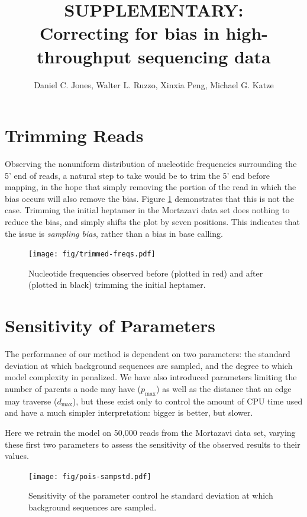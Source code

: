 \documentclass[letterpaper]{article}
\title{SUPPLEMENTARY:\\Correcting for bias in high-throughput sequencing data}
\author{Daniel C. Jones, Walter L. Ruzzo, Xinxia Peng, Michael G. Katze}
\begin{document}


\section{Trimming Reads}

Observing the nonuniform distribution of nucleotide frequencies surrounding the
5' end of reads, a natural step to take would be to trim the 5' end before
mapping, in the hope that simply removing the portion of the read in which the
bias occurs will also remove the bias. Figure \ref{fig:trimmedfreqs}
demonstrates that this is not the case. Trimming the initial heptamer in the
Mortazavi data set does nothing to reduce the bias, and simply shifts the plot
by seven positions. This indicates that the issue is \emph{sampling bias},
rather than a bias in base calling.

\begin{figure}[H]
\begin{center}
\texttt{[image: fig/trimmed-freqs.pdf]}
\end{center}
\caption{Nucleotide frequencies observed before (plotted in red) and after
(plotted in black) trimming the initial heptamer.}
\label{fig:trimmedfreqs}
\end{figure}


\section{Sensitivity of Parameters}

The performance of our method is dependent on two parameters: the standard
deviation at which background sequences are sampled, and the degree to which
model complexity in penalized. We have also introduced parameters limiting the
number of parents a node may have ($p_{\text{max}}$) as well as the distance
that an edge may traverse ($d_{\text{max}}$), but these exist only to control
the amount of CPU time used and have a much simpler interpretation: bigger is
better, but slower.

Here we retrain the model on 50,000 reads from the Mortazavi data
set, varying these first two parameters to assess the sensitivity of the
observed results to their values.

\begin{figure}[H]
\begin{center}
\texttt{[image: fig/pois-sampstd.pdf]}
\end{center}
\caption{Sensitivity of the parameter control he standard deviation at which
background sequences are sampled.}
\label{fig:poissampstd}
\end{figure}
\end{document}
